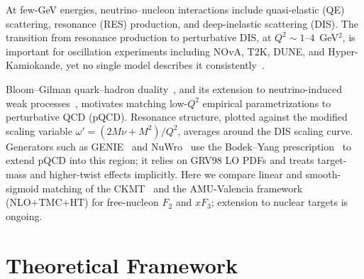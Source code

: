 \documentclass[10pt,twocolumn]{article}
\begin{document}
At few-GeV energies, neutrino--nucleon interactions include quasi-elastic
(QE) scattering, resonance (RES) production, and deep-inelastic
scattering (DIS). The transition from resonance production to perturbative
DIS, at $Q^2 \sim 1$--$4$~GeV$^2$, is important for oscillation experiments
including NOvA, T2K, DUNE, and Hyper-Kamiokande, yet no single model
describes it consistently~\cite{nuxsec}.

Bloom--Gilman quark--hadron duality~\cite{bloomgilman}, and its extension
to neutrino-induced weak processes~\cite{lalakulich}, motivates matching
low-$Q^2$ empirical parametrizations to perturbative QCD (pQCD). Resonance
structure, plotted against the modified scaling variable
$\omega'=(2M\nu+M^2)/Q^2$, averages around the DIS scaling curve.
Generators such as GENIE~\cite{GENIE} and NuWro~\cite{NuWro} use the
Bodek--Yang prescription~\cite{BY} to extend pQCD into this region; it
relies on GRV98 LO PDFs and treats target-mass and higher-twist effects
implicitly. Here we compare linear and smooth-sigmoid matching of the
CKMT~\cite{CKMT} and the AMU-Valencia framework~\cite{Haider2016,Zaidi2020} (NLO+TMC+HT) for free-nucleon $F_2$ and
$xF_3$; extension to nuclear targets is ongoing.

\section{Theoretical Framework}
\label{sec:theory}
\end{document}
